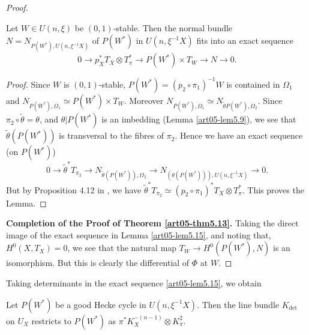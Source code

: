 \begin{proof}
\begin{lemma}\label{art05-lem5.15}
Let $W\in U(n,\xi)$ be $(0,1)$-stable. Then the normal bundle
$N=N_{P(W^{*}),U(n,\xi^{-1}X)}$ of $P(W^{*})$ in $U(n,\xi^{-1}X)$ fits
into an exact sequence
$$
0\to p^{*}_{X}T_{X}\otimes T^{*}_{\pi}\to P(W^{*})\times T_{W}\to N\to 0.
$$
\end{lemma}

\begin{proof}
Since $W$ is $(0,1)$-stable, $P(W^{*})=(p_{2}\circ \pi_{1})^{-1}W$ is
contained in $\Omega_{1}$ and $N_{P(W^{*}),\Omega_{1}}\simeq
P(W^{*})\times T_{W}$. Moreover $N_{P(W^{*}),\Omega_{1}}\simeq
N_{\widetilde{\theta}P(W^{*}),\Omega_{2}}$. Since
$\pi_{2}\circ \widetilde{\theta}=\theta$, and $\theta|P(W^{*})$ is an
imbedding (Lemma \ref{art05-lem5.9}), we see that
$\widetilde{\theta}(P(W^{*}))$ is transversal to the fibres of
$\pi_{2}$. Hence we have an exact sequence (on $P(W^{*})$)
$$
0\to \widetilde{\theta}^{*}T_{\pi_{2}}\to
N_{\widetilde{\theta}(P(W^{*})),\Omega_{2}}\to
N_{(\theta(P(W^{*}))),U(n,\xi^{-1}X)}\to 0.
$$ 
But by Proposition 4.12 in \cite{art05-key5}, we have
$\widetilde{\theta}^{*}T_{\pi_{2}}\simeq
(p_{2}\circ \pi_{1})^{*}T_{X}\otimes T^{*}_{\pi}$. This proves the Lemma.
\end{proof}

\noindent
{\bf Completion of the Proof of Theorem \ref{art05-thm5.13}.}
Taking the direct image of the exact sequence in
Lemma \ref{art05-lem5.15}, and noting that, $H^{0}(X,T_{X})=0$, we see
that the natural map $T_{W}\to H^{0}(P(W^{*}),N)$ is an
isomorphism. But this is clearly the differential of $\Phi$ at $W$.

\end{proof}
Taking determinants in the exact sequence \ref{art05-lem5.15}, we
obtain

\begin{corollary}\label{art05-coro5.16}
Let $P(W^{*})$ be a good Hecke cycle in $U(n,\xi^{-1}X)$. Then the
line bundle $K_{\det}$ on $U_{X}$ restricts to $P(W^{*})$ as
$\pi^{*}K_{X}^{-(n-1)}\otimes K^{2}_{\pi}$. 
\end{corollary}

